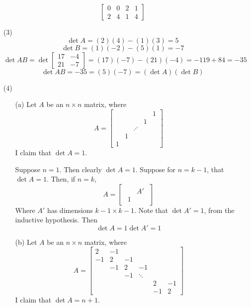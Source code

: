 \begin{itemize}
$$\begin{bmatrix}
0 & 0 & 2 & 1 \\
2 & 4 & 1 & 4
\end{bmatrix}$$
\item[(3)]
$$\det A = (2)(4) - (1)(3) = 5$$
$$\det B = (1)(-2) - (5)(1) = -7$$
$$\det AB = \det\begin{bmatrix}
17 & -4 \\
21 & -7
\end{bmatrix} = (17)(-7) - (21)(-4) = -119 + 84 = -35$$
$$\det AB = -35 = (5)(-7) = (\det A)(\det B)$$
\item[(4)]
\begin{itemize}
\item[(a)]
Let $A$ be an $n \times n$ matrix, where
$$A = \begin{bmatrix}
& & & & 1 \\
& & & 1 & \\
& & \iddots & & \\
& 1 & & & \\
1 & & & &
\end{bmatrix}$$
I claim that $\det A = 1$. 

Suppose $n = 1$. Then clearly $\det A = 1$. Suppose for $n = k - 1$, that $\det A = 1$. Then, if $n = k$,
$$A = \begin{bmatrix}
\begin{array}{c|c}
& A' \\
\hline
1 & 
\end{array}
\end{bmatrix}$$
Where $A'$ has dimensions $k - 1 \times k - 1$. Note that $\det A' = 1$, from the inductive hypothesis. Then
$$\det A = 1\det A' = 1$$
\item[(b)]
Let $A$ be an $n \times n$ matrix, where
$$A = \begin{bmatrix}
2 & -1 \\
-1 & 2 & -1 \\
& -1 & 2 & -1 \\
& & -1 & \ddots \\
& & & & 2 & -1 \\
& & & & -1 & 2
\end{bmatrix}$$
I claim that $\det A = n + 1$.


\end{itemize}
\end{itemize}
